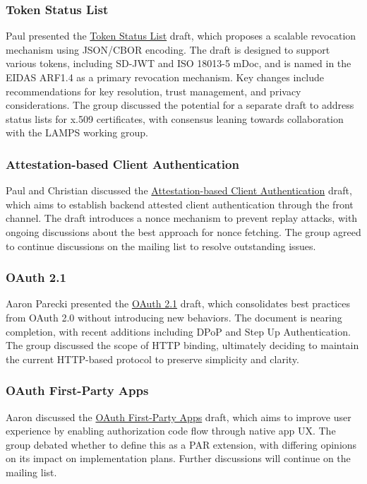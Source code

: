 \documentclass{article}
\begin{document}
\subsubsection{Token Status List}
Paul presented the \href{https://datatracker.ietf.org/doc/draft-ietf-oauth-status-list/}{Token Status List} draft, which proposes a scalable revocation mechanism using JSON/CBOR encoding. The draft is designed to support various tokens, including SD-JWT and ISO 18013-5 mDoc, and is named in the EIDAS ARF1.4 as a primary revocation mechanism. Key changes include recommendations for key resolution, trust management, and privacy considerations. The group discussed the potential for a separate draft to address status lists for x.509 certificates, with consensus leaning towards collaboration with the LAMPS working group.

\subsubsection{Attestation-based Client Authentication}
Paul and Christian discussed the \href{https://datatracker.ietf.org/doc/draft-ietf-oauth-attestation-based-client-auth/}{Attestation-based Client Authentication} draft, which aims to establish backend attested client authentication through the front channel. The draft introduces a nonce mechanism to prevent replay attacks, with ongoing discussions about the best approach for nonce fetching. The group agreed to continue discussions on the mailing list to resolve outstanding issues.

\subsubsection{OAuth 2.1}
Aaron Parecki presented the \href{https://datatracker.ietf.org/doc/draft-ietf-oauth-v2-1/}{OAuth 2.1} draft, which consolidates best practices from OAuth 2.0 without introducing new behaviors. The document is nearing completion, with recent additions including DPoP and Step Up Authentication. The group discussed the scope of HTTP binding, ultimately deciding to maintain the current HTTP-based protocol to preserve simplicity and clarity.

\subsubsection{OAuth First-Party Apps}
Aaron discussed the \href{https://datatracker.ietf.org/doc/draft-ietf-oauth-first-party-apps/}{OAuth First-Party Apps} draft, which aims to improve user experience by enabling authorization code flow through native app UX. The group debated whether to define this as a PAR extension, with differing opinions on its impact on implementation plans. Further discussions will continue on the mailing list.
\end{document}
